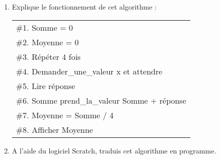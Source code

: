 
\begin{enumerate}
\item Explique le fonctionnement de cet algorithme :

\begin{tabular}{|p{10cm}|}
\hline 
\#1. Somme = 0 \\ 
\#2. Moyenne = 0\\ 
\#3. Répéter 4 fois\\ 
\#4. \hspace{1cm} Demander\_une\_valeur x et attendre\\ 
\#5. \hspace{1cm} Lire réponse\\ 
\#6. \hspace{1cm} Somme prend\_la\_valeur Somme +  réponse\\ 
\#7. Moyenne = Somme / 4\\ 
\#8. Afficher Moyenne\\ 
\hline 
\end{tabular} 

\item A l'aide du logiciel Scratch, traduis cet algorithme en programme. 

\end{enumerate}
